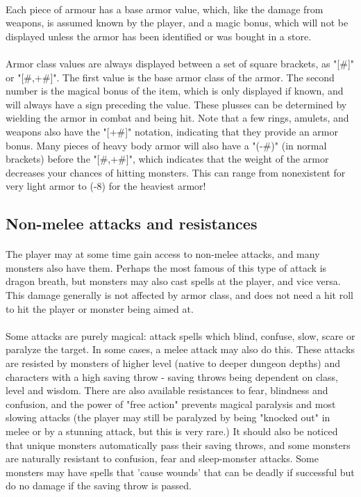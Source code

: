 \paragraph{}
Each piece of armour has a base armor value, which, like the damage from
weapons, is assumed known by the player, and a magic bonus, which will not
be displayed unless the armor has been identified or was bought in a store.

\paragraph{}
Armor class values are always displayed between a set of square brackets,
as "[\#]" or "[\#,+\#]". The first value is the base armor class of the armor.
The second number is the magical bonus of the item, which is only displayed
if known, and will always have a sign preceding the value. These plusses can
be determined by wielding the armor in combat and being hit. Note that a few
rings, amulets, and weapons also have the "[+\#]" notation, indicating that
they provide an armor bonus. Many pieces of heavy body armor will also have
a "(-\#)" (in normal brackets) before the "[\#,+\#]", which indicates that the
weight of the armor decreases your chances of hitting monsters. This can
range from nonexistent for very light armor to (-8) for the heaviest armor!

\subsection{Non-melee attacks and resistances}
\paragraph{}
The player may at some time gain access to non-melee attacks, and many
monsters also have them. Perhaps the most famous of this type of attack is
dragon breath, but monsters may also cast spells at the player, and vice
versa. This damage generally is not affected by armor class, and does not
need a hit roll to hit the player or monster being aimed at.

\paragraph{}
Some attacks are purely magical: attack spells which blind, confuse, slow,
scare or paralyze the target. In some cases, a melee attack may also do
this. These attacks are resisted by monsters of higher level (native to
deeper dungeon depths) and characters with a high saving throw - saving
throws being dependent on class, level and wisdom. There are also available
resistances to fear, blindness and confusion, and the power of "free
action" prevents magical paralysis and most slowing attacks (the player may
still be paralyzed by being "knocked out" in melee or by a stunning attack,
but this is very rare.) It should also be noticed that unique monsters
automatically pass their saving throws, and some monsters are naturally
resistant to confusion, fear and sleep-monster attacks. Some monsters may
have spells that 'cause wounds' that can be deadly if successful but do no
damage if the saving throw is passed.

